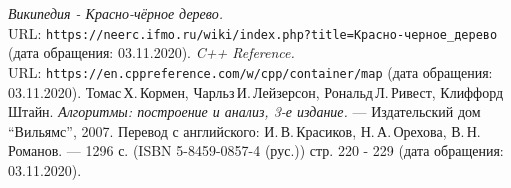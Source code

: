 
\begin{thebibliography}{99}
{\itshape Википедия - Красно-чёрное дерево.} \\URL: \texttt{https://neerc.ifmo.ru/wiki/index.php?title=Красно-черное\_дерево} (дата обращения: 03.11.2020).
{\itshape C++ Reference.} \\URL: \texttt{https://en.cppreference.com/w/cpp/container/map} (дата обращения: 03.11.2020).
Томас\,Х.\,Кормен, Чарльз\,И.\,Лейзерсон, Рональд\,Л.\,Ривест, Клиффорд\,Штайн.
{\itshape Алгоритмы: построение и анализ, 3-е издание.} --- Издательский дом \enquote{Вильямс}, 2007. Перевод с английского: И.\,В.\,Красиков, Н.\,А.\,Орехова, В.\,Н.\,Романов. --- 1296 с. (ISBN 5-8459-0857-4 (рус.)) стр. 220 - 229 (дата обращения: 03.11.2020).
\end{thebibliography}
\pagebreak